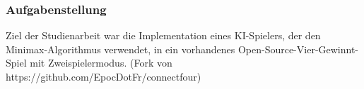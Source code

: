 \begin{frame}
\frametitle{Aufgabenstellung}
Ziel der Studienarbeit war die Implementation eines KI-Spielers, der den Minimax-Algorithmus verwendet, in ein vorhandenes Open-Source-Vier-Gewinnt-Spiel mit Zweispielermodus. 
(Fork von https://github.com/EpocDotFr/connectfour)
\end{frame}

